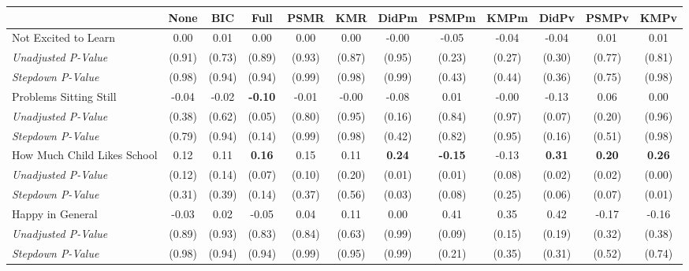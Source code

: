 \begin{tabular}{l c c c c c c c c c c c}
\toprule
 & None & BIC & Full & PSMR & KMR & DidPm & PSMPm & KMPm & DidPv & PSMPv & KMPv \\
\midrule
Not Excited to Learn & 0.00 & 0.01 & 0.00 & 0.00 & 0.00 & -0.00 & -0.05 & -0.04 & -0.04 & 0.01 & 0.01 \\
\quad \textit{Unadjusted P-Value} & (0.91) & (0.73) & (0.89) & (0.93) & (0.87) & (0.95) & (0.23) & (0.27) & (0.30) & (0.77) & (0.81) \\
\quad \textit{Stepdown P-Value} & (0.98) & (0.94) & (0.94) & (0.99) & (0.98) & (0.99) & (0.43) & (0.44) & (0.36) & (0.75) & (0.98) \\
Problems Sitting Still & -0.04 & -0.02 & \textbf{ -0.10 } & -0.01 & -0.00 & -0.08 & 0.01 & -0.00 & -0.13 & 0.06 & 0.00 \\
\quad \textit{Unadjusted P-Value} & (0.38) & (0.62) & (0.05) & (0.80) & (0.95) & (0.16) & (0.84) & (0.97) & (0.07) & (0.20) & (0.96) \\
\quad \textit{Stepdown P-Value} & (0.79) & (0.94) & (0.14) & (0.99) & (0.98) & (0.42) & (0.82) & (0.95) & (0.16) & (0.51) & (0.98) \\
How Much Child Likes School & 0.12 & 0.11 & \textbf{ 0.16 } & 0.15 & 0.11 & \textbf{ 0.24 } & \textbf{ -0.15 } & -0.13 & \textbf{ 0.31 } & \textbf{ 0.20 } & \textbf{ 0.26 } \\
\quad \textit{Unadjusted P-Value} & (0.12) & (0.14) & (0.07) & (0.10) & (0.20) & (0.01) & (0.01) & (0.08) & (0.02) & (0.02) & (0.00) \\
\quad \textit{Stepdown P-Value} & (0.31) & (0.39) & (0.14) & (0.37) & (0.56) & (0.03) & (0.08) & (0.25) & (0.06) & (0.07) & (0.01) \\
Happy in General & -0.03 & 0.02 & -0.05 & 0.04 & 0.11 & 0.00 & 0.41 & 0.35 & 0.42 & -0.17 & -0.16 \\
\quad \textit{Unadjusted P-Value} & (0.89) & (0.93) & (0.83) & (0.84) & (0.63) & (0.99) & (0.09) & (0.15) & (0.19) & (0.32) & (0.38) \\
\quad \textit{Stepdown P-Value} & (0.98) & (0.94) & (0.94) & (0.99) & (0.95) & (0.99) & (0.21) & (0.35) & (0.31) & (0.52) & (0.74) \\
\bottomrule
\end{tabular}
